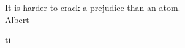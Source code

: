 \documentclass[a4paper,12pt,bibliography=totoc,index=totoc,twoside,francais]{scrbook}
\begin{document}


\frontmatter
\begin{flushright}
It is harder to crack a prejudice than an atom.\\
Albert \\
\end{flushright}

\tableofcontents
\listoftables
\listoffigures

\mainmatter








\appendix

%
\gls{ti}

\backmatter
\nocite{*}
\printbibliography
\printindex

\glsaddall
\printglossaries

\cleardoublepage

\end{document}
